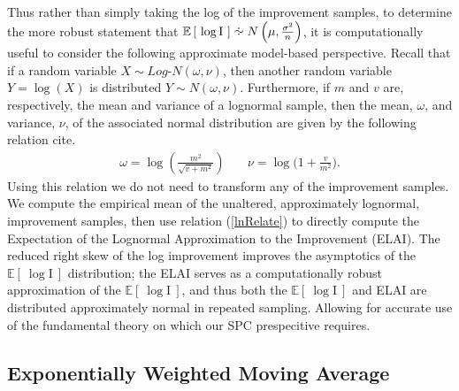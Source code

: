 \documentclass[12pt]{article}
\newcommand{\E}[1]{
        \mathbb{E}\left[~#1~\right]
}
\newcommand*{\approxdist}{\mathrel{\vcenter{\offinterlineskip
\vskip-.25ex\hbox{\hskip.55ex$\cdot$}\vskip-.25ex\hbox{$\sim$}
\vskip-.5ex\hbox{\hskip.55ex$\cdot$}}}}
\begin{document}
%
Thus rather than simply taking the log of the improvement samples, to determine the more robust statement that $\mathbb{E}\left[~\log\text{I}~\right] \approxdist N\left(\mu, \frac{\sigma^2}{n}\right)$, it is computationally useful to consider the following approximate model-based perspective.   
%
Recall that if a random variable \mbox{$X\sim Log$-$N(\omega, \nu)$,} then another random variable $Y=\log(X)$ is distributed $Y\sim N(\omega, \nu)$.
%
Furthermore, if $m$ and $v$ are, respectively, the mean and variance of a lognormal sample, then the mean, $\omega$, and variance, $\nu$, of the associated normal distribution are given by the following relation {\color{red}cite}.
%
\begin{eqnarray}
\omega = \log\left( \frac{m^2}{\sqrt{v+m^2}} \right) &~&  \nu = \log\bigg( 1+ \frac{v}{m^2} \bigg).
\label{lnRelate}
\end{eqnarray}
%
Using this relation we do not need to transform any of the improvement samples.
%
We compute the empirical mean of the unaltered, approximately lognormal, improvement samples, then use relation (\ref{lnRelate}) to directly compute the Expectation of the Lognormal Approximation to the Improvement (ELAI).
%
The reduced right skew of the log improvement improves the asymptotics of the $\E{\log\text{I}}$ distribution; the ELAI serves as a computationally robust approximation of the $\E{\log\text{I}}$, and thus both the $\E{\log\text{I}}$ and ELAI are distributed approximately normal in repeated sampling.
%
Allowing for accurate use of the fundamental theory on which our SPC prespecitive requires.


\clearpage
%
%
\subsection{Exponentially Weighted Moving Average}
%
%
\end{document}
